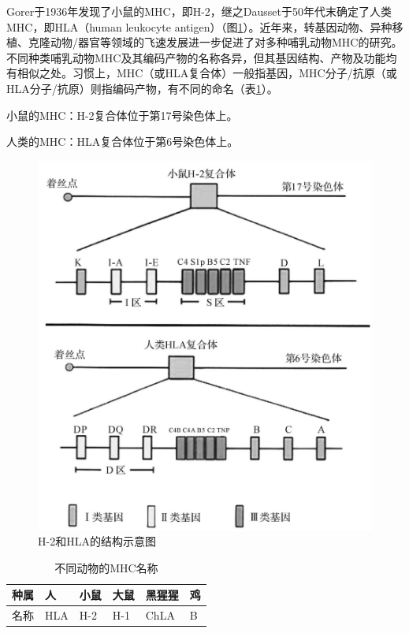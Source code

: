 Gorer于1936年发现了小鼠的MHC，即H-2，继之Dausset于50年代末确定了人类MHC，即HLA（human
leukocyte
antigen）（图\ref{fig7-1}）。近年来，转基因动物、异种移植、克隆动物/器官等领域的飞速发展进一步促进了对多种哺乳动物MHC的研究。不同种类哺乳动物MHC及其编码产物的名称各异，但其基因结构、产物及功能均有相似之处。习惯上，MHC（或HLA复合体）一般指基因，MHC分子/抗原（或HLA分子/抗原）则指编码产物，有不同的命名（表\ref{tab7-1}）。

小鼠的MHC：H-2复合体位于第17号染色体上。

人类的MHC：HLA复合体位于第6号染色体上。

\begin{figure}[!htbp]
 \centering
 \includegraphics{./images/Image00102.jpg}
 \captionsetup{justification=centering}
 \caption{H-2和HLA的结构示意图}
 \label{fig7-1}
  \end{figure} 

\begin{longtable}[]{@{}llllll@{}}
    \caption{不同动物的MHC名称}
    \label{tab7-1}\\
\toprule
种属 & 人 & 小鼠 & 大鼠 & 黑猩猩 & 鸡\tabularnewline
\midrule
\endhead
名称 & HLA & H-2 & H-1 & ChLA & B\tabularnewline
\bottomrule
\end{longtable}


